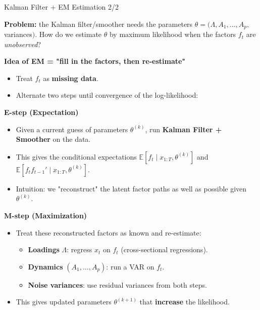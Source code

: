 \documentclass{beamer}
\begin{document}
\begin{frame}[label=em-intuition]{Kalman Filter + EM Estimation 2/2}
\scriptsize

\textbf{Problem:} the Kalman filter/smoother needs the parameters 
$\theta = (\Lambda, A_1,\dots,A_p,$ variances$)$.
How do we estimate $\theta$ by maximum likelihood when the factors $f_t$ are \emph{unobserved}?

\medskip

\textbf{Idea of EM = "fill in the factors, then re-estimate"}
\begin{itemize}
  \item Treat $f_t$ as \textbf{missing data}.
  \item Alternate two steps until convergence of the log-likelihood:
\end{itemize}

\medskip

\textbf{E-step (Expectation)}
\begin{itemize}
  \item Given a current guess of parameters $\theta^{(k)}$, run
        \textbf{Kalman Filter + Smoother} on the data.
  \item This gives the conditional expectations
        $\mathbb{E}[f_t \mid x_{1:T}, \theta^{(k)}]$ and
        $\mathbb{E}[f_t f_{t-1}' \mid x_{1:T}, \theta^{(k)}]$.
  \item Intuition: we "reconstruct" the latent factor paths as well as possible given $\theta^{(k)}$.
\end{itemize}

\medskip

\textbf{M-step (Maximization)}
\begin{itemize}
  \item Treat these reconstructed factors as known and re-estimate:
  \begin{itemize}
  \scriptsize
    \item \textbf{Loadings} $\Lambda$: regress $x_t$ on $f_t$ (cross-sectional regressions).
    \item \textbf{Dynamics} $(A_1,\dots,A_p)$: run a VAR on $f_t$.
    \item \textbf{Noise variances}: use residual variances from both steps.
  \end{itemize}
  \item This gives updated parameters $\theta^{(k+1)}$ that \textbf{increase} the likelihood.
\end{itemize}


\end{frame}
\end{document}
